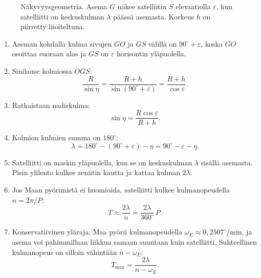 \documentclass[a4paper,11pt]{article}
\begin{document}
\begin{figure}[ht]
\centering
{}
\caption{Näkyvyysgeometria. Asema $G$ näkee satelliitin $S$ elevaatiolla $\varepsilon$, kun satelliitti on keskuskulman $\lambda$ päässä asemasta. Korkeus $h$ on piirretty liioiteltuna.}
\label{fig:kolmio}
\end{figure}

\begin{enumerate}
  \item Aseman kohdalla kulma sivujen $GO$ ja $GS$ välillä on $90^\circ + \varepsilon$, koska $GO$ osoittaa suoraan alas ja $GS$ on $\varepsilon$ horisontin yläpuolella.
  \item Sinilause kolmiossa $OGS$:
  \[
  \frac{R}{\sin\eta} = \frac{R+h}{\sin(90^\circ+\varepsilon)} = \frac{R+h}{\cos\varepsilon}.
  \]
  \item Ratkaistaan nadirkulma:
  \[
  \sin\eta = \frac{R\cos\varepsilon}{R+h}.
  \]
  \item Kolmion kulmien summa on $180^\circ$:
  \[
  \lambda = 180^\circ - (90^\circ+\varepsilon) - \eta = 90^\circ - \varepsilon - \eta.
  \]
  \item Satelliitti on maskin yläpuolella, kun se on keskuskulman $\lambda$ sisällä asemasta. Pisin ylilento kulkee zeniitin kautta ja kattaa kulman $2\lambda$.
  \item Jos Maan pyörimistä ei huomioida, satelliitti kulkee kulmanopeudella $n = 2\pi/P$:
  \[
  T \approx \frac{2\lambda}{n} = \frac{2\lambda}{360^\circ}\,P.
  \]
  \item Konservatiivinen yläraja: Maa pyörii kulmanopeudella $\omega_E \approx 0,2507^\circ/\text{min}$, ja asema voi pahimmillaan liikkua samaan suuntaan kuin satelliitti. Suhteellinen kulmanopeus on silloin vähintään $n - \omega_E$:
  \[
  T_\text{max} = \frac{2\lambda}{n-\omega_E}.
  \]
\end{enumerate}
\end{document}
